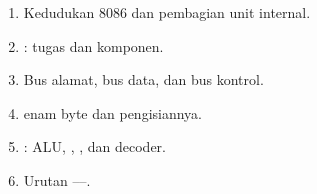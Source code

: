 \documentclass[../../main.tex]{subfiles}
\begin{document}
\begin{materibox}
\vspace{1.1em}
\begin{enumerate}
    \item Kedudukan 8086 dan pembagian unit internal.
    \item {}: tugas dan komponen.
    \item Bus alamat, bus data, dan bus kontrol.
    \item {} enam byte dan pengisiannya.
    \item {}: ALU, , , dan
          decoder.
    \item Urutan ----.
\end{enumerate}
\end{materibox}










\end{document}
